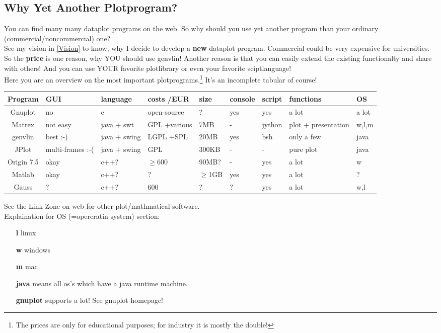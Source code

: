 \documentclass[12pt]{article}
\begin{document}
\subsection{Why Yet Another Plotprogram?}
You can find many many dataplot programs on the web. So why should you use yet another program than your ordinary
(commercial/noncommercial) one?\\
See my vision in \ref{Vision} to know, why I decide to develop a {\bf new} dataplot program.
Commercial could be very expensive for universities. So the {\bf price} is one reason, why YOU should use genvlin!
Another reason is that you can easily extend the existing functionalty and share with others!
And you can use YOUR favorite plotlibrary or even your favorite sciptlanguage!\\
Here you are an overview on the most important plotprograms.\footnote{The prices are only for educational purposes; for industry it is mostly the double!} It's an incomplete tabular of course!
\begin{center}
\begin{tabular}{c|p{1cm}	|p{1.4cm}	|p{1cm}		|p{1.2cm}	|p{1.2cm}	|l		|p{1.5cm}	|p{0.5cm}}
Program 	& GUI 		& language	& costs /EUR	& size		& console	& script	& functions		& OS\\
\hline
Gnuplot		& no		& c		& open-source	& ?		& yes		& yes		& a lot			& a lot\\
Matrex		& not easy	& java + swt	& GPL +various	& 7MB		& -		& jython	& plot + presentation	& w,l,m\\
genvlin		& best :-)	& java + swing	& LGPL +SPL	& 20MB		& yes		& bsh		& only a few		& java\\
JPlot		& multi-frames :-( & java + swing& GPL		& 300KB		& -		& -		& pure plot		& java\\
Origin 7.5	& okay 		& c++?		& $\geq 600$	& 90MB?		& -		& yes		& a lot			& w\\
Matlab		& okay		& c++?		& ?		& $\geq$1GB	& yes		& yes		& a lot			& ?\\
Gauss		& ?		& c++?		& 600		& ?		& ?		& yes		& a lot			& w,l\\
\end{tabular}
\end{center}
\newpage
See the Link Zone on web for other plot/mathmatical software.\\
Explaination for OS (=opereratin system) section:
\begin{center}
\begin{itemize}
\item[\bf l] linux
\item[\bf w] windows
\item[\bf m] mac
\item[\bf java] means all os's which have a java runtime machine.
\item[\bf gnuplot] supports a lot! See gnuplot homepage!
\end{itemize}
\end{center}
\end{document}
